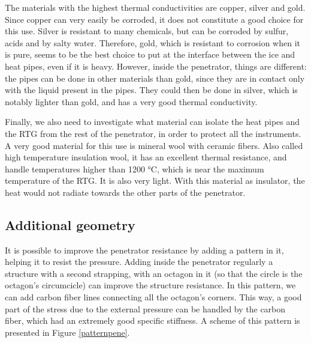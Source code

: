 The materials with the highest thermal conductivities are copper, silver and gold. Since copper can very easily be corroded, it does not constitute a good choice for this use. Silver is resistant to many chemicals, but can be corroded by sulfur, acids and by salty water. Therefore, gold, which is resistant to corrosion when it is pure, seems to be the best choice to put at the interface between the ice and heat pipes, even if it is heavy. However, inside the penetrator, things are different: the pipes can be done in other materials than gold, since they are in contact only with the liquid present in the pipes. They could then be done in silver, which is notably lighter than gold, and has a very good thermal conductivity.

Finally, we also need to investigate what material can isolate the heat pipes and the RTG from the rest of the penetrator, in order to protect all the instruments. A very good material for this use is mineral wool with ceramic fibers. Also called high temperature insulation wool, it has an excellent thermal resistance, and handle temperatures higher than 1200 °C, which is near the maximum temperature of the RTG. It is also very light. With this material as insulator, the heat would not radiate towards the other parts of the penetrator.

\subsection{Additional geometry}

It is possible to improve the penetrator resistance by adding a pattern in it, helping it to resist the pressure. Adding inside the penetrator regularly a structure with a second strapping, with an octagon in it (so that the circle is the octagon's circumcicle) can improve the structure resistance. In this pattern, we can add carbon fiber lines connecting all the octagon's corners. This way, a good part of the stress due to the external pressure can be handled by the carbon fiber, which had an extremely good specific stiffness. A scheme of this pattern is presented in Figure \ref{patternpene}.

